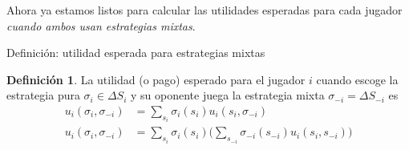 \documentclass[12pt]{scrartcl}
\theoremstyle{definition}
\newtheorem{defi}{Definición}[section]
\begin{document}
Ahora ya estamos listos para calcular las utilidades esperadas para cada jugador \textit{cuando ambos usan estrategias mixtas}. 
\vspace{1cm}

\begin{mybox}{Definición: utilidad esperada para estrategias mixtas}
    \begin{defi}
        La utilidad (o pago) esperado para el jugador $i$ cuando escoge la estrategia pura $\sigma_i \in \Delta S_i$ y su oponente juega la estrategia mixta $\sigma_{-i} = \Delta S_{-i}$ es
        \begin{align*}
            u_i(\sigma_i, \sigma_{-i}) &= \sum_{s_{i}} \sigma_{i}(s_{i})u_i(s_i,\sigma_{-i}) \\
            u_i(\sigma_i, \sigma_{-i}) &= \sum_{s_{i}} \sigma_i(s_i)\Bigg ( \sum_{s_{-i}} \sigma_{-i}(s_{-i})u_i(s_i,s_{-i}) \Bigg )
        \end{align*} 
    \end{defi}
\end{mybox}
\end{document}
